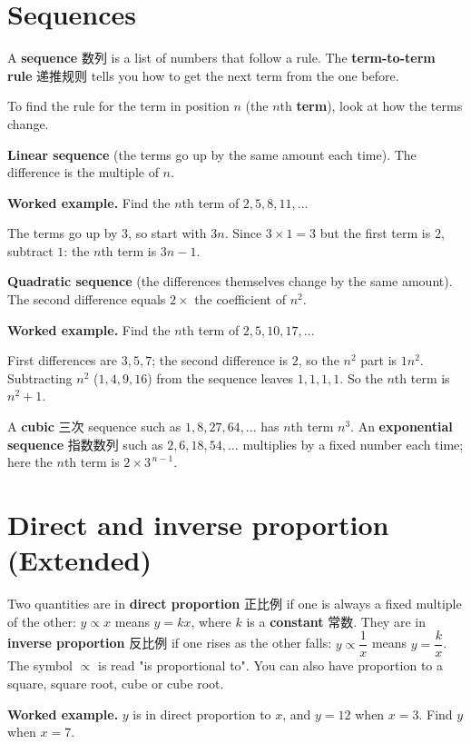 \documentclass[11pt]{article}
\begin{document}
\section*{Sequences}

A \textbf{sequence} 数列 is a list of numbers that follow a rule. The \textbf{term-to-term rule} 递推规则 tells you how to get the next term from the one before.

To find the rule for the term in position $n$ (the $n$th \textbf{term}), look at how the terms change.

\textbf{Linear sequence} (the terms go up by the same amount each time). The difference is the multiple of $n$.

\textbf{Worked example.} Find the $n$th term of $2, 5, 8, 11, \dots$

The terms go up by $3$, so start with $3n$. Since $3 \times 1 = 3$ but the first term is $2$, subtract $1$: the $n$th term is $3n - 1$.

\textbf{Quadratic sequence} (the differences themselves change by the same amount). The second difference equals $2 \times$ the coefficient of $n^{2}$.

\textbf{Worked example.} Find the $n$th term of $2, 5, 10, 17, \dots$

First differences are $3, 5, 7$; the second difference is $2$, so the $n^{2}$ part is $1n^{2}$. Subtracting $n^{2}$ ($1, 4, 9, 16$) from the sequence leaves $1, 1, 1, 1$. So the $n$th term is $n^{2} + 1$.

A \textbf{cubic} 三次 sequence such as $1, 8, 27, 64, \dots$ has $n$th term $n^{3}$. An \textbf{exponential sequence} 指数数列 such as $2, 6, 18, 54, \dots$ multiplies by a fixed number each time; here the $n$th term is $2 \times 3^{\,n-1}$.

\section*{Direct and inverse proportion (Extended)}

Two quantities are in \textbf{direct proportion} 正比例 if one is always a fixed multiple of the other: $y \propto x$ means $y = kx$, where $k$ is a \textbf{constant} 常数. They are in \textbf{inverse proportion} 反比例 if one rises as the other falls: $y \propto \dfrac{1}{x}$ means $y = \dfrac{k}{x}$. The symbol $\propto$ is read "is proportional to". You can also have proportion to a square, square root, cube or cube root.

\textbf{Worked example.} $y$ is in direct proportion to $x$, and $y = 12$ when $x = 3$. Find $y$ when $x = 7$.
\end{document}
